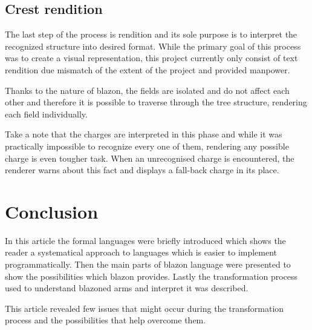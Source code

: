 \documentclass[12pt,a4paper]{article}
\let\oldsection\section
\renewcommand\section{\clearpage\oldsection}
\begin{document}
\subsection{Crest rendition}
The last step of the process is rendition and its sole purpose is to interpret the recognized structure into desired format.
While the primary goal of this process was to create a visual representation, this project currently only consist of text rendition due mismatch of the extent of the project and provided manpower.

Thanks to the nature of blazon, the fields are isolated and do not affect each other and therefore it is possible to traverse through the tree structure, rendering each field individually.

Take a note that the charges are interpreted in this phase and while it was practically impossible to recognize every one of them, rendering any possible charge is even tougher task.
When an unrecognised charge is encountered, the renderer warns about this fact and displays a fall-back charge in its place.

\section{Conclusion}
In this article the formal languages were briefly introduced which shows the reader a systematical approach to languages which is easier to implement programmatically.
Then the main parts of blazon language were presented to show the possibilities which blazon provides.
Lastly the transformation process used to understand blazoned arms and interpret it was described.

This article revealed few issues that might occur during the transformation process and the possibilities that help overcome them.



{\raggedright\small
	
}

\end{document}
